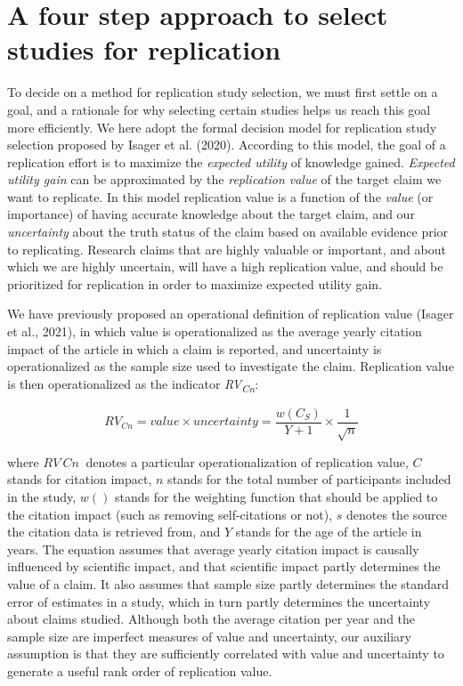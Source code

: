 \documentclass[
  man,floatsintext]{apa6}
\begin{document}
\hypertarget{a-four-step-approach-to-select-studies-for-replication}{%
\section{A four step approach to select studies for replication}\label{a-four-step-approach-to-select-studies-for-replication}}

To decide on a method for replication study selection, we must first settle on a goal, and a rationale for why selecting certain studies helps us reach this goal more efficiently. We here adopt the formal decision model for replication study selection proposed by Isager et al. (2020). According to this model, the goal of a replication effort is to maximize the \emph{expected utility} of knowledge gained. \emph{Expected utility gain} can be approximated by the \emph{replication value} of the target claim we want to replicate. In this model replication value is a function of the \emph{value} (or importance) of having accurate knowledge about the target claim, and our \emph{uncertainty} about the truth status of the claim based on available evidence prior to replicating. Research claims that are highly valuable or important, and about which we are highly uncertain, will have a high replication value, and should be prioritized for replication in order to maximize expected utility gain.

We have previously proposed an operational definition of replication value (Isager et al., 2021), in which value is operationalized as the average yearly citation impact of the article in which a claim is reported, and uncertainty is operationalized as the sample size used to investigate the claim. Replication value is then operationalized as the indicator \emph{RV\textsubscript{Cn}}:

\begin{equation} 
  \tag{1}
  RV_{Cn} = value\times uncertainty = \frac{w(C_{S})}{Y+1}\times\frac{1}{\sqrt{n}}
  \label{eq:1}
\end{equation}

where \(RV~Cn~\) denotes a particular operationalization of replication value, \(C\) stands for citation impact, \(n\) stands for the total number of participants included in the study, \(w()\) stands for the weighting function that should be applied to the citation impact (such as removing self-citations or not), \(s\) denotes the source the citation data is retrieved from, and \(Y\) stands for the age of the article in years. The equation assumes that average yearly citation impact is causally influenced by scientific impact, and that scientific impact partly determines the value of a claim. It also assumes that sample size partly determines the standard error of estimates in a study, which in turn partly determines the uncertainty about claims studied. Although both the average citation per year and the sample size are imperfect measures of value and uncertainty, our auxiliary assumption is that they are sufficiently correlated with value and uncertainty to generate a useful rank order of replication value.
\end{document}
